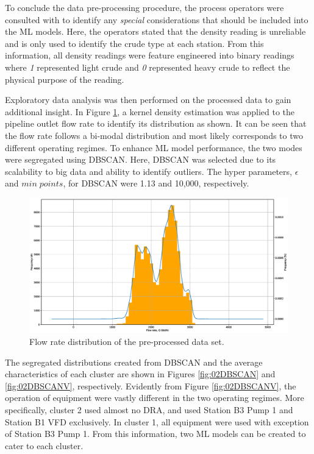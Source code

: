 To conclude the data pre-processing procedure, the process operators were consulted with to identify any \textit{special} considerations that should be included into the ML models.  Here, the operators stated that the density reading is unreliable and is only used to identify the crude type at each station. From this information, all density readings were feature engineered into binary readings where \textit{1} represented light crude and \textit{0} represented heavy crude to reflect the physical purpose of the reading.

Exploratory data analysis was then performed on the processed data to gain additional insight. In Figure \ref{fig:02KDE}, a kernel density estimation was applied to the pipeline outlet flow rate to identify its distribution as shown.  It can be seen that the flow rate follows a bi-modal distribution and most likely corresponds to two different operating regimes. To enhance ML model performance, the two modes were segregated using DBSCAN.  Here, DBSCAN was selected due to its scalability to big data and ability to identify outliers. The hyper parameters, $\epsilon$ and $min \; points$, for DBSCAN were 1.13 and 10,000, respectively.

\begin{figure}[h]
    \centering
    \includegraphics[width=\textwidth]{images/suncor/08Flowrate_KDE.eps}
    \caption{Flow rate distribution of the pre-processed data set.}
    \label{fig:02KDE}
\end{figure}

The segregated distributions created from DBSCAN and the average characteristics of each cluster are shown in Figures \ref{fig:02DBSCAN} and \ref{fig:02DBSCANV}, respectively.  Evidently from Figure \ref{fig:02DBSCANV}, the operation of equipment were vastly different in the two operating regimes.  More specifically, cluster 2 used almost no DRA, and used Station B3 Pump 1 and Station B1 VFD exclusively.  In cluster 1, all equipment were used with exception of Station B3 Pump 1.  From this information, two ML models can be created to cater to each cluster.

